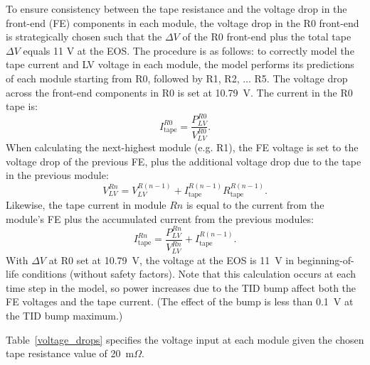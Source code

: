 To ensure consistency between
the tape resistance and the voltage drop in the front-end (FE) components in each module,
the voltage drop in the R0 front-end is strategically chosen such that the $\Delta V$
of the R0 front-end plus the total tape $\Delta V$ equals 11 V at the EOS.
The procedure is as follows:
to correctly model the tape current and LV voltage in each module, the model performs its predictions
of each module starting from R0, followed by R1, R2, ... R5. The voltage drop across the front-end
components in R0 is set at 10.79~V. The current in the R0 tape is:
%
\[
I^{R0}_\text{tape} = \frac{P^{R0}_{LV}}{V^{R0}_{LV}}.
\]
When calculating the next-highest module (e.g. R1), the FE voltage is set to the voltage drop of the
previous FE, plus the additional voltage drop due to the tape in the previous module:
\[
V^{Rn}_{LV} = V^{R(n-1)}_{LV} + I^{R(n-1)}_\text{tape} R^{R(n-1)}_\text{tape}.
\]
Likewise, the tape current in module $Rn$ is equal to the current from the module's FE plus the
accumulated current from the previous modules:
\[
I^{Rn}_\text{tape} = \frac{P^{Rn}_{LV}}{V^{Rn}_{LV}} + I^{R(n-1)}_\text{tape}.
\]
With $\Delta V$ at R0 set at 10.79~V, the voltage at the EOS is 11~V in beginning-of-life conditions
(without safety factors).
Note that this calculation occurs at each time step in the model, so power increases due to the TID
bump affect both the FE voltages and the tape current.
(The effect of the bump is less than 0.1~V at the TID bump maximum.)

Table~\ref{voltage_drops} specifies the voltage input at each module given the
chosen tape resistance value of 20~m$\Omega$.

\begin{table}[ht]
\begin{center}
\end{center}
\caption{Voltage inputs for each endcap module. The EOS is assumed to have an 11V input voltage.}
\label{voltage_drops}
\end{table}

